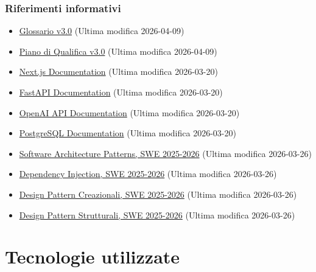 \documentclass[a4paper, 11pt, oneside]{scrartcl}
\begin{document}
\subsubsection{Riferimenti informativi}
\begin{itemize}
    \item \href{https://swenightpro.github.io/Documentazione/docs/PB/Documentazione%20Esterna/Glossario.pdf}{Glossario v3.0} (Ultima modifica 2026-04-09)
    \item \href{https://swenightpro.github.io/Documentazione/docs/PB/Documentazione%20Esterna/Piano_Di_Qualifica.pdf}{Piano di Qualifica v3.0} (Ultima modifica 2026-04-09)
    \item \href{https://nextjs.org/docs}{Next.js Documentation} (Ultima modifica 2026-03-20)
    \item \href{https://fastapi.tiangolo.com/}{FastAPI Documentation} (Ultima modifica 2026-03-20)
    \item \href{https://platform.openai.com/docs}{OpenAI API Documentation} (Ultima modifica 2026-03-20)
    \item \href{https://www.postgresql.org/docs/}{PostgreSQL Documentation} (Ultima modifica 2026-03-20)
    \item \href{https://www.math.unipd.it/~rcardin/swea/2022/Software%20Architecture%20Patterns.pdf}{Software Architecture Patterns, SWE 2025-2026} (Ultima modifica 2026-03-26)
    \item \href{https://www.math.unipd.it/~rcardin/swea/2022/Design%20Pattern%20Architetturali%20-%20Dependency%20Injection.pdf}{Dependency Injection, SWE 2025-2026} (Ultima modifica 2026-03-26)
    \item \href{https://www.math.unipd.it/~rcardin/swea/2022/Design%20Pattern%20Creazionali.pdf}{Design Pattern Creazionali, SWE 2025-2026} (Ultima modifica 2026-03-26)
    \item \href{https://www.math.unipd.it/~rcardin/swea/2022/Design%20Pattern%20Strutturali.pdf}{Design Pattern Strutturali, SWE 2025-2026} (Ultima modifica 2026-03-26)

\end{itemize}

\newpage

\section{Tecnologie utilizzate}
\end{document}
